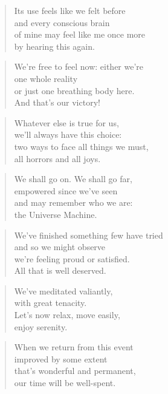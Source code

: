 \documentclass[14pt,a4paper]{article}
\begin{document}
\begin{verse}
Its use feels like we felt before\\
and every conscious brain\\
of mine may feel like me once more\\
by hearing this again.
\end{verse}

\begin{verse}
We’re free to feel now: either we’re\\
one whole reality\\
or just one breathing body here.\\
And that’s our victory!
\end{verse}

\begin{verse}
Whatever else is true for us,\\
we’ll always have this choice:\\
two ways to face all things we must,\\
all horrors and all joys.
\end{verse}

\begin{verse}
We shall go on. We shall go far,\\
empowered since we’ve seen\\
and may remember who we are:\\
the Universe Machine.
\end{verse}

\begin{verse}
We’ve finished something few have tried\\
and so we might observe\\
we’re feeling proud or satisfied.\\
All that is well deserved.
\end{verse}

\begin{verse}
We’ve meditated valiantly,\\
with great tenacity.\\
Let’s now relax, move easily,\\
enjoy serenity.
\end{verse}

\begin{verse}
When we return from this event\\
improved by some extent\\
that’s wonderful and permanent,\\
our time will be well-spent.
\end{verse}
\end{document}

